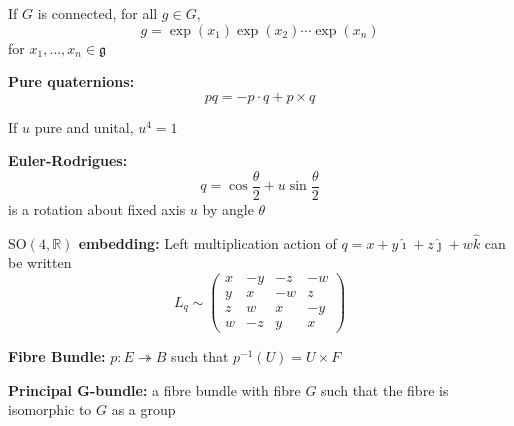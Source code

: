 \documentclass[12pt]{article}
\renewcommand{\hat}[1]{\widehat{#1}}
\newcommand{\R}{\mathbb{R}}
\newcommand{\SO}{\text{SO}}
\newcommand{\g}{\mathfrak{g}}
\newcommand{\ihat}{\hat{\imath}}
\newcommand{\jhat}{\hat{\jmath}}
\newcommand{\khat}{\hat{k}}
\begin{document}
\begin{multicols}{2}
If $G$ is connected, for all $g \in G$,
\[g = \exp(x_1)\exp(x_2) \cdots \exp(x_n)\]
for $x_1, \dots, x_n \in \g$

\textbf{Pure quaternions:} 
\[pq = -p \cdot q + p \times q\]

If $u$ pure and unital, $u^4 = 1$ 

\textbf{Euler-Rodrigues:} 
\[q = \cos \frac{\theta}{2} + u \sin \frac{\theta}{2}\] 
is a rotation about fixed axis $u$ by angle $\theta$

\textbf{$\SO(4, \R)$ embedding:} Left multiplication action of $q = x + y\ihat + z\jhat + w\khat$ can be written 
\[L_q \sim \begin{pmatrix}
    x & -y & -z & -w\\
    y & x & -w & z\\
    z & w & x & -y\\
    w & -z & y & x
\end{pmatrix}\]

\textbf{Fibre Bundle:} $p: E \twoheadrightarrow B$ such that $p^{-1}(U) = U \times F$

\textbf{Principal G-bundle:} a fibre bundle with fibre $G$ such that the fibre is isomorphic to $G$ as a group

\end{multicols}
\end{document}
